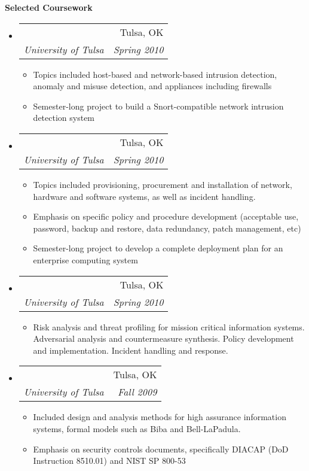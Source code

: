 \documentclass[letterpaper,11pt]{article}
\makeatletter
\newcommand{\resitem}[1]{\item #1 \vspace{-2pt}}
\newcommand{\resheading}[1]{{\large \colorbox{mygrey}{\begin{minipage}{\textwidth}{\textbf{#1 \vphantom{p\^{E}}}}\end{minipage}}}}
\newcommand{\ressubheading}[4]{
\begin{tabular*}{6.5in}{l@{\extracolsep{\fill}}r}
		\textbf{\parbox{5in}{\raggedright #1 }} & #2 \\
		\textit{#3} & \textit{#4} \\
\end{tabular*}\vspace{-6pt}}
\makeatother
\begin{document}
\resheading{Selected Coursework}
\begin{itemize}

\item
	\ressubheading{Network Security}{Tulsa, OK}{University of Tulsa}{Spring 2010}
	\begin{itemize}
		\resitem{Topics included host-based and network-based intrusion detection, anomaly and misuse detection, and appliances including firewalls}
		\resitem{Semester-long project to build a Snort-compatible network intrusion detection system}
	\end{itemize}
\item
	\ressubheading{Secure System Administration}{Tulsa, OK}{University of Tulsa}{Spring 2010}
	\begin{itemize}
		\resitem{Topics included provisioning, procurement and installation of network, hardware and software systems, as well as incident handling.}
		\resitem{Emphasis on specific policy and procedure development (acceptable use, password, backup and restore, data redundancy, patch management, etc)}
		\resitem{Semester-long project to develop a complete deployment plan for an enterprise computing system}
	\end{itemize}
\item
	\ressubheading{Risk Management for Information Systems}{Tulsa, OK}{University of Tulsa}{Spring 2010}
	\begin{itemize}
		\resitem{Risk analysis and threat profiling for mission critical information systems. Adversarial analysis and countermeasure synthesis. Policy development and implementation. Incident handling and response.}
	\end{itemize}
\item
	\ressubheading{Information Systems Assurance}{Tulsa, OK}{University of Tulsa}{Fall 2009}
	\begin{itemize}
		\resitem{Included design and analysis methods for high assurance information systems, formal models such as Biba and Bell-LaPadula.}
		\resitem{Emphasis on security controls documents, specifically DIACAP (DoD Instruction 8510.01) and NIST SP 800-53}

\end{itemize}
\end{itemize}
\end{document}
